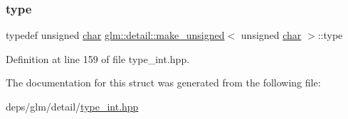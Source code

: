 \subsubsection{\texorpdfstring{type}{type}}
{\footnotesize\ttfamily typedef unsigned \hyperlink{classchar}{char} \hyperlink{structglm_1_1detail_1_1make__unsigned}{glm\+::detail\+::make\+\_\+unsigned}$<$ unsigned \hyperlink{classchar}{char} $>$\+::type}



Definition at line 159 of file type\+\_\+int.\+hpp.



The documentation for this struct was generated from the following file\+:\begin{DoxyCompactItemize}
\item 
deps/glm/detail/\hyperlink{type__int_8hpp}{type\+\_\+int.\+hpp}\end{DoxyCompactItemize}
